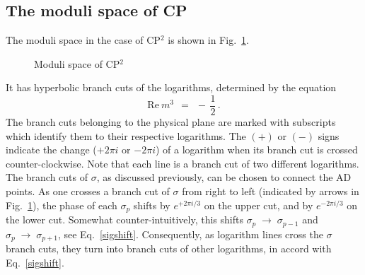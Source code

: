 \documentclass[epsfig,12pt]{article}
\def\beq{\begin{equation}}
\def\eeq{\end{equation}}
\def\beq{\begin{equation}}
\def\eeq{\end{equation}}
\begin{document}

\subsection{The moduli space of CP}

	The moduli space in the case of CP$^2$ is shown in Fig.~\ref{fcp2}. 
\begin{figure}
\begin{center}
\epsfxsize=7.5cm
\caption{Moduli space of CP$^2$}
\label{fcp2}
\end{center}
\end{figure}
	It has hyperbolic branch cuts of the logarithms, determined by the equation
\beq
	\text{Re}~m^3 ~~=~~ -\,\frac{1}{2}\,.
\eeq
	The branch cuts belonging to the physical plane are marked with subscripts which
	identify them to their respective logarithms.
	The $ {\scriptstyle (+)} $ or $ {\scriptstyle (-)} $ signs indicate 
	the change ($ + 2 \pi i $ or $ - 2 \pi i $) of a logarithm 
	when its branch cut is crossed counter-clockwise.
	Note that each line is a branch cut of two different logarithms. 
	The branch cuts of $ \sigma $, as discussed previously, can be chosen to connect the AD points.
	As one crosses a branch cut of $ \sigma $ from right to left (indicated by arrows in Fig.~\ref{fcp2}), 
	the phase of each $ \sigma_p $ shifts by $ e^{+ 2 \pi i / 3} $ on the upper cut, 
	and by $ e^{- 2 \pi i / 3} $ on the lower cut.
	Somewhat counter-intuitively, 
	this shifts $ \sigma_p \;\to\; \sigma_{p-1} $ and $ \sigma_p \;\to\; \sigma_{p+1} $,
	see Eq.~\eqref{sigshift}.
	Consequently, as logarithm lines cross the $ \sigma $ branch cuts, they turn into branch
	cuts of other logarithms, in accord with Eq.~\eqref{sigshift}.
\end{document}
